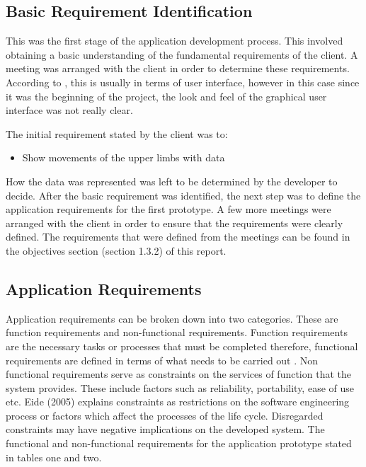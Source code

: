 \documentclass[a4paper, 12pt]{article}
\begin{document}
\subsection{Basic Requirement Identification}
This was the first stage of the application development process. This involved obtaining a basic understanding of the fundamental requirements of the client. A meeting was arranged with the client in order to determine these requirements. According to \citet{Sabale2012}, this is usually in terms of user interface, however in this case since it was the beginning of the project, the look and feel of the graphical user interface was not really clear.

The initial requirement stated by the client was to: 
\begin{itemize}
 \item Show movements of the upper limbs with data
\end{itemize} 

How the data was represented was left to be determined by the developer to decide. After the basic requirement was identified, the next step was to define the application requirements for the first prototype. A few more meetings were arranged with the client in order to ensure that the requirements were clearly defined. The requirements that were defined from the meetings can be found in the objectives section (section 1.3.2) of this report. 



\subsection{Application Requirements}
Application requirements can be broken down into two categories. These are function requirements and non-functional requirements. Function requirements are the necessary tasks or processes that must be completed therefore, functional requirements are defined in terms of what needs to be carried out \citep{Defence2001}. Non functional requirements serve as constraints on the services of function that the system provides. These include factors such as reliability, portability, ease of use etc. Eide (2005) explains constraints as restrictions on the software engineering process or factors which affect the processes of the life cycle. Disregarded constraints may have negative implications on the developed system. The functional and non-functional requirements for the application prototype stated in tables one and two. 
\end{document}
